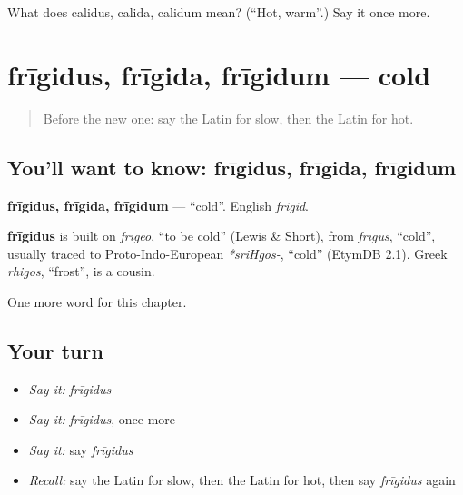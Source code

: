 \begin{tcolorbox}[breakable,colback=teal!4,colframe=teal!35!black,title={Before you move on}]
What does calidus, calida, calidum mean? (\textquotedblleft{}Hot, warm\textquotedblright{}.) Say it once more.
\end{tcolorbox}
\section[frīgidus, frīgida, frīgidum]{frīgidus, frīgida, frīgidum — cold}

\label{lesson:LA-C95-frigidus}



\begin{quote}
Before the new one: say the Latin for slow, then the Latin for hot.
\end{quote}

\subsection*{You'll want to know: frīgidus, frīgida, frīgidum}
\textbf{frīgidus, frīgida, frīgidum} — \textquotedblleft{}cold\textquotedblright{}. English \emph{frigid}.

\begin{cousinweb}
\textbf{frīgidus} is built on \emph{frīgeō}, \textquotedblleft{}to be cold\textquotedblright{} (Lewis \& Short), from \emph{frīgus}, \textquotedblleft{}cold\textquotedblright{}, usually traced to Proto-Indo-European \emph{*sriHgos-}, \textquotedblleft{}cold\textquotedblright{} (EtymDB 2.1). Greek \emph{rhigos}, \textquotedblleft{}frost\textquotedblright{}, is a cousin.
\end{cousinweb}

\begin{grammarlens}[title={What you've built}]
One more word for this chapter.
\end{grammarlens}

\subsection*{Your turn}
\begin{itemize}
\raggedright
  \item \emph{Say it:} \emph{frīgidus}
  \item \emph{Say it:} \emph{frīgidus}, once more
  \item \emph{Say it:} say \emph{frīgidus}
  \item \emph{Recall:} say the Latin for slow, then the Latin for hot, then say \emph{frīgidus} again
\end{itemize}

